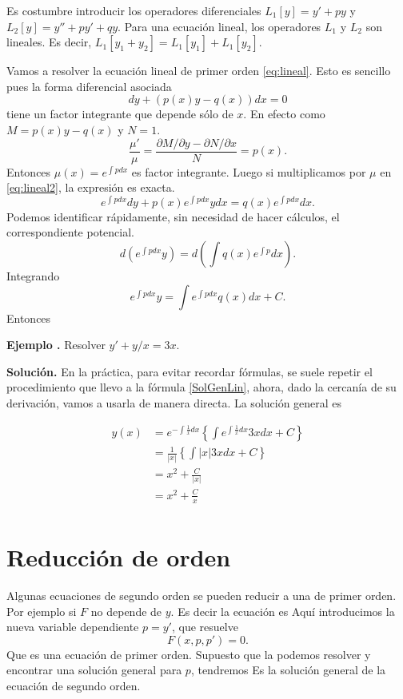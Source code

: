 \documentclass{article}
\newcounter{ejemplo_cont}
\newenvironment{ejemplo}{\noindent\textbf{Ejemplo  \arabic{ejemplo_cont}.} }{\addtocounter{ejemplo_cont}{1}}
\begin{document}
Es costumbre introducir los operadores  diferenciales $L_1[y]=y'+py$  y $ L_2[y]=y''+py'+qy$.
Para una ecuación lineal, los operadores $L_1$ y $L_2$ son lineales. Es decir, $L_1[y_1+y_2]=L_1[y_1]+L_1[y_2]$.


 Vamos a resolver la ecuación lineal de primer orden \eqref{eq:lineal}. Esto es sencillo pues la forma diferencial asociada
 \begin{equation}\label{eq:lineal2}dy+(p(x)y-q(x))dx=0
  \end{equation}
tiene un factor integrante que depende sólo de $x$. En efecto como $M=p(x)y-q(x)$ y $N=1$.
 \[\frac{\mu'}{\mu}=\frac{\partial M/\partial y-\partial N/\partial x}{N}=p(x).\]
 Entonces $\mu(x)=e^{\int pdx}$ es factor integrante. Luego si multiplicamos por $\mu$ en \eqref{eq:lineal2},  la expresión  es exacta. 
 \[e^{\int pdx}dy+p(x)e^{\int pdx}ydx=q(x)e^{\int pdx}dx.\]
Podemos identificar rápidamente, sin necesidad de hacer cálculos, el correspondiente potencial.
 \[d\left(e^{\int pdx}y\right)=d\left(\int q(x)e^{\int p} dx \right).\]
Integrando
\[e^{\int pdx}y=\int e^{\int pdx}q(x)dx+C.
 \]
Entonces
 

\begin{ejemplo} Resolver $y'+y/x=3x$.
 \end{ejemplo}


\noindent\textbf{Solución.} En la práctica, para evitar recordar fórmulas, se suele repetir el procedimiento que llevo a la fórmula \eqref{SolGenLin}, ahora, dado la cercanía
de su derivación, vamos a usarla  de manera directa. La solución general es

\[\begin{split} y(x)&=e^{-\int\frac{1}{x}dx}\left\{\int e^{\int\frac{1}{x}dx}3xdx+C\right\}\\
   &=\frac{1}{|x|}\left\{\int |x| 3xdx+C\right\}\\
   &=x^2+\frac{C}{|x|}\\
   &=x^2+\frac{C}{x}\\
  \end{split}
\]
 



\section{Reducción de orden}

Algunas ecuaciones de segundo orden
se pueden reducir a una de primer orden. Por ejemplo si $F$ no depende de $y$. Es decir la ecuación es
Aquí introducimos la nueva variable dependiente $\boxed{p=y'}$, que resuelve
\[F(x,p,p')=0.\]
Que es una ecuación de primer orden. Supuesto que la podemos resolver y encontrar una solución general para  $p$, tendremos
Es la solución general de la ecuación de segundo orden.
\end{document}
